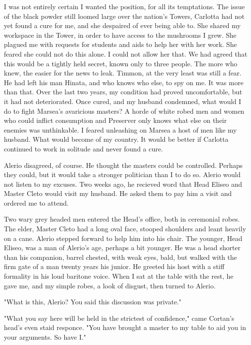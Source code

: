 \documentclass{article}
\begin{document}
I was not entirely certain I wanted the position, for all its temptations. The issue of the black powder still loomed large over the nation's Towers, Carlotta had not yet found a cure for me, and she despaired of ever being able to. She shared my workspace in the Tower, in order to have access to the mushrooms I grew. She plagued me with requests for students and aids to help her with her work. She feared she could not do this alone. I could not allow her that. We had agreed that this would be a tightly held secret, known only to three people. The more who knew, the easier for the news to leak. Timmon, at the very least was still a fear. He had left his man Hinata, and who knows who else, to spy on me. It was more than that. Over the last two years, my condition had proved uncomfortable, but it had not deteriorated. Once cured, and my husband condemned, what would I do to fight Marsea's avaricious masters? A horde of white robed men and women who could inflict consumption and Preserver only knows what else on their enemies was unthinkable. I feared unleashing on Marsea a host of men like my husband. What would become of my country. It would be better if Carlotta continued to work in solitude and never found a cure. 

Alerio disagreed, of course. He thought the masters could be controlled. Perhaps they could, but it would take a stronger politician than I to do so. Alerio would not listen to my excuses. Two weeks ago, he recieved word that Head Eliseo and Master Cleto would visit my husband. He asked them to pay him a visit and ordered me to attend.

Two wary grey headed men entered the Head's office, both in ceremonial robes. The elder, Master Cleto had a long oval face, stooped shoulders and leant heavily on a cane. Alerio stepped forward to help him into his chair. The younger, Head Eliseo, was a man of Alerio's age, perhaps a bit younger. He was a head shorter than his companion, barrel chested, with weak eyes, bald, but walked with the firm gate of a man twenty years his junior. He greeted his host with a stiff formality in his loud baritone voice. When I sat at the table with the rest, he gave me, and my simple robes, a look of disgust, then turned to Alerio.

"What is this, Alerio? You said this discussion was private."

"What you say here will be held in the strictest of confidence," came Cortan's head's even staid responce. "You have brought a master to my table to aid you in your arguments. So have I."
\end{document}
